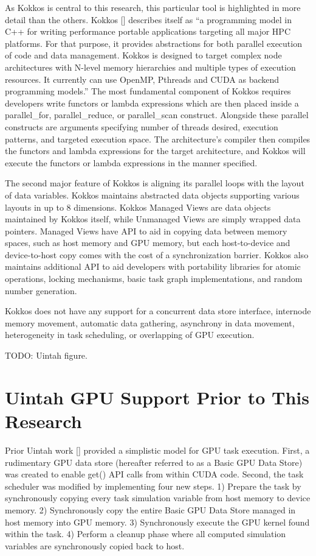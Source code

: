 \documentclass[12pt]{article}
\begin{document}
As Kokkos is central to this research, this particular tool is highlighted in more detail than the others.  Kokkos [] describes itself as “a programming model in C++ for writing performance portable applications targeting all major HPC platforms. For that purpose, it provides abstractions for both parallel execution of code and data management. Kokkos is designed to target complex node architectures with N-level memory hierarchies and multiple types of execution resources. It currently can use OpenMP, Pthreads and CUDA as backend programming models.”  The most fundamental component of Kokkos requires developers write functors or lambda expressions which are then placed inside a parallel\_for, parallel\_reduce, or parallel\_scan construct.  Alongside these parallel constructs are arguments specifying number of threads desired, execution patterns, and targeted execution space.  The architecture’s compiler then compiles the functors and lambda expressions for the target architecture, and Kokkos will execute the functors or lambda expressions in the manner specified.  

The second major feature of Kokkos is aligning its parallel loops with the layout of data variables.  Kokkos maintains abstracted data objects supporting various layouts in up to 8 dimensions.   Kokkos Managed Views are data objects maintained by Kokkos itself, while Unmanaged Views are simply wrapped data pointers.  Managed Views have API to aid in copying data between memory spaces, such as host memory and GPU memory, but each host-to-device and device-to-host copy comes with the cost of a synchronization barrier.  Kokkos also maintains additional API to aid developers with portability libraries for atomic operations, locking mechanisms, basic task graph implementations, and random number generation.
  
Kokkos does not have any support for a concurrent data store interface, internode memory movement, automatic data gathering, asynchrony in data movement, heterogeneity in task scheduling, or overlapping of GPU execution.


TODO: Uintah figure.

\section{Uintah GPU Support Prior to This Research}
\label{ch:proposal}

Prior Uintah work [] provided a simplistic model for GPU task execution.  First, a rudimentary GPU data store (hereafter referred to as a Basic GPU Data Store) was created to enable get() API calls from within CUDA code.  Second, the task scheduler was modified by implementing four new steps.  1) Prepare the task by synchronously copying every task simulation variable from host memory to device memory. 2) Synchronously copy the entire Basic GPU Data Store managed in host memory into GPU memory.  3) Synchronously execute the GPU kernel found within the task.  4) Perform a cleanup phase where all computed simulation variables are synchronously copied back to host.  
	
\end{document}
